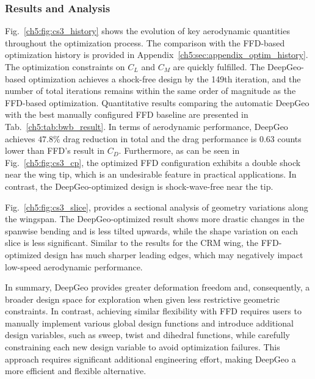\subsubsection{Results and Analysis}

Fig.~\ref{ch5:fig:cs3_history} shows the evolution of key aerodynamic quantities throughout the optimization process. The comparison with the FFD-based optimization history is provided in Appendix~\ref{ch5:sec:appendix_optim_history}. The optimization constraints on $C_L$ and $C_M$ are quickly fulfilled. The DeepGeo-based optimization achieves a shock-free design by the 149th iteration, and the number of total iterations remains within the same order of magnitude as the FFD-based optimization. Quantitative results comparing the automatic DeepGeo with the best manually configured FFD baseline are presented in Tab.~\ref{ch5:tab:bwb_result}. In terms of aerodynamic performance, DeepGeo achieves $47.8\%$ drag reduction in total and the drag performance is $0.63$ counts lower than FFD's result in $C_D$. Furthermore, as can be seen in Fig.~\ref{ch5:fig:cs3_cp}, the optimized FFD configuration exhibits a double shock near the wing tip, which is an undesirable feature in practical applications. In contrast, the DeepGeo-optimized design is shock-wave-free near the tip. 

Fig.~\ref{ch5:fig:cs3_slice}, provides a sectional analysis of geometry variations along the wingspan. The DeepGeo-optimized result shows more drastic changes in the spanwise bending and is less tilted upwards, while the shape variation on each slice is less significant. Similar to the results for the CRM wing, the FFD-optimized design has much sharper leading edges, which may negatively impact low-speed aerodynamic performance.

In summary, DeepGeo provides greater deformation freedom and, consequently, a broader design space for exploration when given less restrictive geometric constraints. In contrast, achieving similar flexibility with FFD requires users to manually implement various global design functions and introduce additional design variables, such as sweep, twist and dihedral functions, while carefully constraining each new design variable to avoid optimization failures. This approach requires significant additional engineering effort, making DeepGeo a more efficient and flexible alternative.